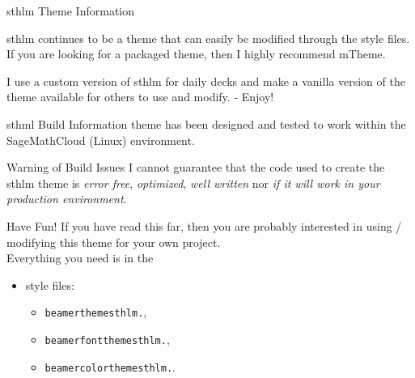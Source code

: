 \documentclass[newPxFont,numfooter,sectionpages]{beamer}
\begin{document}

\begin{frame}[c]{sthlm Theme Information}
	
\alert{sthlm} continues to be a theme that can easily be modified through the style files.  If you are looking for a packaged theme, then I highly recommend \alert{mTheme}.\\

\vspace{1em}

I use a custom version of \alert{sthlm} for daily decks and make a vanilla version of the theme available for others to use and modify. - Enjoy!

\end{frame}


\begin{frame}[c]{sthml Build Information}
 theme has been designed and tested to work within the SageMathCloud (Linux) environment.\\

\vspace{1em}

\begin{alertblock}{Warning of Build Issues}
I cannot guarantee that the code used to create the sthlm theme is \emph{error free}, \emph{optimized}, \emph{well written} nor \emph{if it will work in your production environment}.
\end{alertblock}


\end{frame}


\begin{frame}[c]{Have Fun!}
If you have read this far, then you are probably interested in using / modifying this theme for your own project. \\
\vspace{1em}
Everything you need is in the

\begin{itemize}
	\item style files:
	\begin{itemize}
		\item \texttt{beamerthemesthlm.},
		\item \texttt{beamerfontthemesthlm.},
		\item \texttt{beamercolorthemesthlm.}.
	\end{itemize}
\end{itemize}

\end{frame}
\end{document}
